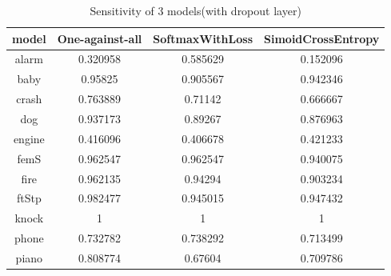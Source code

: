 \begin{table}[h!]
	\caption{Sensitivity of 3 models(with dropout layer)}
	\label{tab:sens}
	\begin{tabular}{|c|c|c|c|}
	\hline	model	&	\textbf{One-against-all}	&	\textbf{SoftmaxWithLoss}	&	\textbf{SimoidCrossEntropy}	\\
	\hline	alarm 	&	0.320958	&	0.585629	&	0.152096	\\
	\hline	baby 	&	0.95825	&	0.905567	&	0.942346	\\
	\hline	crash 	&	0.763889	&	0.71142	&	0.666667	\\
	\hline	dog 	&	0.937173	&	0.89267	&	0.876963	\\
	\hline	engine 	&	0.416096	&	0.406678	&	0.421233	\\
	\hline	femS 	&	0.962547	&	0.962547	&	0.940075	\\
	\hline	fire 	&	0.962135	&	0.94294	&	0.903234	\\
	\hline	ftStp 	&	0.982477	&	0.945015	&	0.947432	\\
	\hline	knock 	&	1	&	1	&	1	\\
	\hline	phone 	&	0.732782	&	0.738292	&	0.713499	\\
	\hline	piano 	&	0.808774	&	0.67604	&	0.709786	\\
	\hline
	\end{tabular} 
\end{table}

